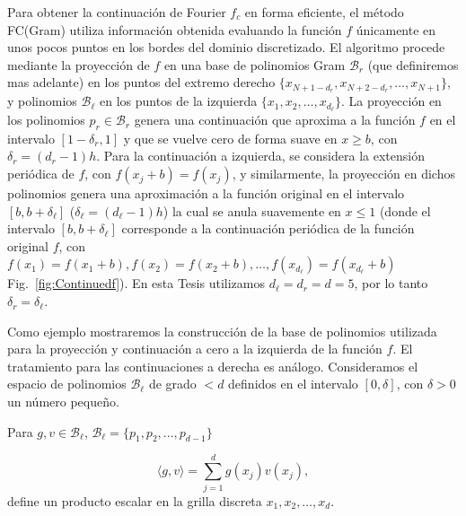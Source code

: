 Para obtener la continuación de Fourier $f_c$ en forma eficiente, el método FC(Gram) utiliza información obtenida 
evaluando la función $f$ únicamente en unos pocos puntos 
en los bordes del dominio discretizado. 
El algoritmo procede mediante la proyección de $f$ en una base de polinomios Gram $\mathcal{B}_r$ 
(que definiremos mas adelante) en los puntos del extremo 
derecho $\{x_{N+1-d_r},x_{N+2-d_r},\ldots, x_{N+1} \}$, y 
polinomios $\mathcal{B}_{\ell}$ en los puntos de la izquierda $\{x_{1},x_{2},\ldots, x_{d_{\ell}} \}$. 
La proyección en los polinomios $p_r \in \mathcal{B}_r$ genera una continuación que 
aproxima a la función $f$ en el intervalo $[1-\delta_r,1]$ y que se vuelve cero de 
forma suave en $x\ge b$, con $\delta_r=(d_r-1)h$. Para la continuación a izquierda, se considera 
la extensión periódica de $f$, con $f(x_j+b)=f(x_j)$, y similarmente, la proyección 
en dichos polinomios genera una aproximación a la función original en el intervalo $[b,b+\delta_{\ell}]$ ($\delta_{\ell}=(d_{\ell}-1)h$) la cual se anula suavemente en $x\leq 1$ (donde el 
intervalo $[b,b+\delta_{\ell}]$ corresponde a la continuación periódica de la función original $f$, con $f(x_1)=f(x_1+b),f(x_2)=f(x_2+b),\ldots, f(x_{d_{\ell}})=f(x_{d_{\ell}}+b)$ Fig.~\ref{fig:Continuedf}). 
En esta Tesis utilizamos $d_{\ell}=d_r=d=5$, por lo tanto $\delta_r=\delta_{\ell}$.  

Como ejemplo mostraremos la construcción de la base 
de polinomios utilizada para la proyección y continuación a cero 
a la izquierda de la función $f$. El tratamiento para las continuaciones a derecha 
es análogo.
Consideramos el espacio de polinomios $\mathcal{B}_{\ell}$ de grado $<d$ definidos en el intervalo $[0,\delta]$, con $\delta>0$ un número pequeño.

Para $g,v\in \mathcal{B}_{\ell}$, $\mathcal{B}_{\ell}=\{p_1,p_2,...,p_{d-1}\}$

\begin{equation}
\langle g,v\rangle =\sum_{j=1}^{d}g(x_j)v(x_j),
\label{eq:dotpd}
\end{equation}
define un producto escalar en la grilla discreta $x_1,x_2,\ldots,x_d$.

